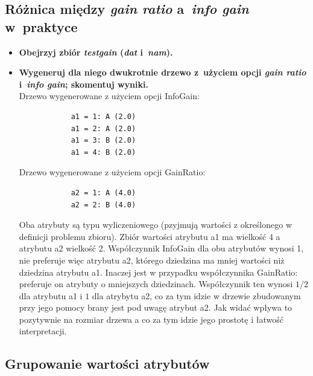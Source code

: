 \subsection{Różnica między \emph{gain ratio} a~\emph{info gain} w~praktyce}

\begin{itemize}
\item \textbf{Obejrzyj zbiór \emph{testgain} (\emph{dat} i~\emph{nam}).}
\item \textbf{Wygeneruj dla niego dwukrotnie drzewo z~użyciem opcji \emph{gain ratio} i~\emph{info gain}; skomentuj wyniki.}
\\Drzewo wygenerowane z użyciem opcji InfoGain:		
		\begin{verbatim}
			a1 = 1: A (2.0)
			a1 = 2: A (2.0)
			a1 = 3: B (2.0)
			a1 = 4: B (2.0)	
		\end{verbatim}


	Drzewo wygenerowane z użyciem opcji GainRatio:
		\begin{verbatim}
			a2 = 1: A (4.0)
			a2 = 2: B (4.0)
		\end{verbatim}

	Oba atrybuty są typu wyliczeniowego (pzyjmują wartości z określonego w definicji problemu zbioru). Zbiór wartości atrybutu a1 ma wielkość 4 a atrybutu a2 wielkość 2. Współczynnik InfoGain dla obu atrybutów wynosi 1, nie preferuje więc atrybutu a2, którego dziedzina ma mniej  wartości niż dziedzina atrybutu a1. Inaczej jest w przypadku współczynnika GainRatio:  preferuje on atrybuty o mniejszych dziedzinach. Współczynnik ten wynosi $ 1/2  $ dla atrybutu a1 i $ 1 $ dla atrybytu a2, co za tym idzie w drzewie zbudowanym przy jego pomocy brany jest pod uwagę atrybut a2. Jak widać wpływa to pozytywnie na rozmiar drzewa a co za tym idzie jego prostotę i łatwość interpretacji.

	
\end{itemize}

\subsection{Grupowanie wartości atrybutów}

